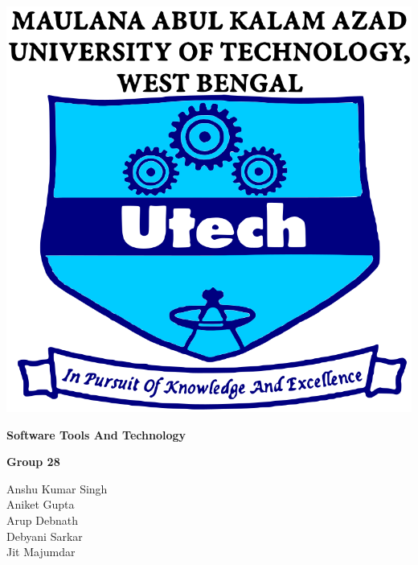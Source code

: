 \begin{titlepage}

\centering  


\vspace{2cm}

\includegraphics[width=.64\textwidth]{Images/makaut_logo.png}

\vspace{1.5cm}

\huge \textbf{Software Tools And Technology}

\vspace{1.5cm}

\vspace{5mm}

\textbf{\large Group 28}

\centering
\sffamily
\large

{ \large
Anshu Kumar Singh \\
Aniket Gupta \\
Arup Debnath \\
Debyani Sarkar \\
Jit Majumdar
}

\mbox{}
\vfill



\end{titlepage}
    
    
    
    
    
    
    
    
    